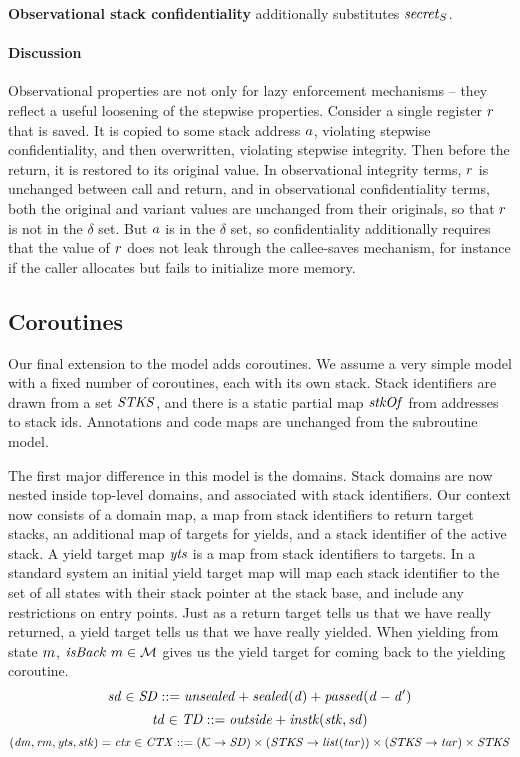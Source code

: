 \documentclass[acmsmall,review,anonymous]{acmart}\settopmatter{printfolios=true,printccs=false,printacmref=false}
\begin{document}
{{\bf Observational stack confidentiality} additionally substitutes \(\mathit{secret}_S\).

\paragraph{Discussion}

Observational properties are not only for lazy enforcement mechanisms -- they reflect a useful
loosening of the stepwise properties. Consider a single register \(r\) that is saved.
It is copied to some stack address \(a\), violating stepwise confidentiality, and then
overwritten, violating stepwise integrity. Then before the return, it is restored to its
original value. In observational integrity terms, \(r\) is unchanged between call and return,
and in observational confidentiality terms, both the original and variant values are unchanged
from their originals, so that \(r\) is not in the \(\delta\) set. But \(a\) is in the
\(\delta\) set, so confidentiality additionally requires that the value of \(r\) does not
leak through the callee-saves mechanism, for instance if the caller allocates but fails to
initialize more memory.

\subsection{Coroutines}

Our final extension to the model adds coroutines. We assume a very simple model with
a fixed number of coroutines, each with its own stack.
Stack identifiers are drawn from a set \(\mathit{STKS}\), and there is a static partial map
\(\mathit{stkOf}\) from addresses to stack ids.  Annotations and code maps are unchanged from
the subroutine model.

The first major difference in this model is the domains. Stack domains are now nested inside
top-level domains, and associated with stack identifiers.
Our context now consists of a domain map, a map from stack identifiers to return target stacks,
an additional map of targets for yields, and a stack identifier of the active stack.
A yield target map \(\mathit{yts}\) is a map from stack identifiers to targets.
In a standard system an initial yield target map will map each stack identifier to the
set of all states with their stack pointer at the stack base, and include any restrictions
on entry points. Just as a return target tells us that we have really returned, a yield
target tells us that we have really yielded. When yielding from state \(m\),
\(\mathit{isBack} ~ m \in {\mathcal M}\) gives us the yield target for coming back to the yielding
coroutine.
%
\[\mathit{sd} \in \mathit{SD} ::= \mathit{unsealed} + \mathit{sealed(d)} + \mathit{passed(d-d')}\]
\[\mathit{td} \in \mathit{TD} ::= \mathit{outside} + \mathit{instk}(\mathit{stk},\mathit{sd})\]
\[(\mathit{dm},\mathit{rm},\mathit{yts},\mathit{stk}) = \mathit{ctx} \in \mathit{CTX} ::=
 ({\mathcal K} \rightarrow \mathit{SD}) \times
(\mathit{STKS} \rightarrow \mathit{list}(\mathit{tar})) \times (\mathit{STKS} \rightarrow \mathit{tar}) \times \mathit{STKS}\]

}
\end{document}
